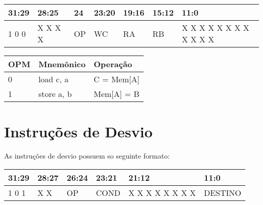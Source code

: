 \documentclass{report}
\begin{document}
   \FloatBarrier
    \begin{table}[H]
      \begin{center}
        \begin{tabular}[pos]{|m{2cm}|m{2cm}|m{1cm}|m{1cm}|m{1cm}|m{1cm}|m{6cm}|} 
          \hline
          \cellcolor[gray]{0.9}\textbf{31:29} & 
          \cellcolor[gray]{0.9}\textbf{28:25} &
          \cellcolor[gray]{0.9}\textbf{24} &
          \cellcolor[gray]{0.9}\textbf{23:20} &
          \cellcolor[gray]{0.9}\textbf{19:16} &
          \cellcolor[gray]{0.9}\textbf{15:12} & 
          \cellcolor[gray]{0.9}\textbf{11:0} \\ \hline
            1 0 0 & X X X X & OP & WC & RA & RB &  X X X X X X X X X X X X \\ \hline
        \end{tabular}
      \end{center}
    \end{table}  

   \FloatBarrier
    \begin{table}[H]
      \begin{center}
        \begin{tabular}[pos]{|m{4cm}|m{4cm}|m{8cm}|} 
          \hline
          \cellcolor[gray]{0.9}\textbf{OPM} & 
          \cellcolor[gray]{0.9}\textbf{Mnemônico} &
          \cellcolor[gray]{0.9}\textbf{Operação} \\ \hline
            0 & load c, a & C = Mem[A] \\ \hline
            1 & store a, b & Mem[A] = B \\ \hline
        \end{tabular}
      \end{center}
    \end{table}  
  
  
\section{Instruções de Desvio}
As instruções de desvio possuem so seguinte formato:

   \FloatBarrier
    \begin{table}[H]
      \begin{center}
        \begin{tabular}[pos]{|m{2cm}|m{2cm}|m{1cm}|m{2cm}|m{5cm}|m{2cm}|} 
          \hline
          \cellcolor[gray]{0.9}\textbf{31:29} & 
          \cellcolor[gray]{0.9}\textbf{28:27} &
          \cellcolor[gray]{0.9}\textbf{26:24} &
          \cellcolor[gray]{0.9}\textbf{23:21} &
          \cellcolor[gray]{0.9}\textbf{21:12} &
          \cellcolor[gray]{0.9}\textbf{11:0} \\ \hline
            1 0 1 & X X & OP & COND & X X X X X X X X & DESTINO \\ \hline
        \end{tabular}
      \end{center}
    \end{table}  
\end{document}
